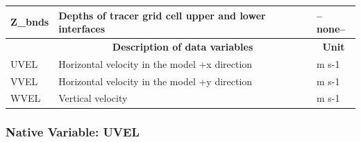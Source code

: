 \begin{longtable}{|m{}|m{}|m{}|}
Z\_bnds &Depths of tracer grid cell upper and lower interfaces &--none--  \\ \hline
\rowcolor{lightgray} \multicolumn{1}{|c|}{\textbf{Variables}} & \multicolumn{1}{|c|}{\textbf{Description of data variables}} &  \multicolumn{1}{|c|}{\textbf{Unit}}\\ \hline
UVEL &Horizontal velocity in the model +x direction &m s-1  \\ \hline
VVEL &Horizontal velocity in the model +y direction &m s-1  \\ \hline
WVEL &Vertical velocity &m s-1  \\ \hline
\end{longtable}

\newp
\pagebreak
\subsubsection{Native Variable: UVEL}

